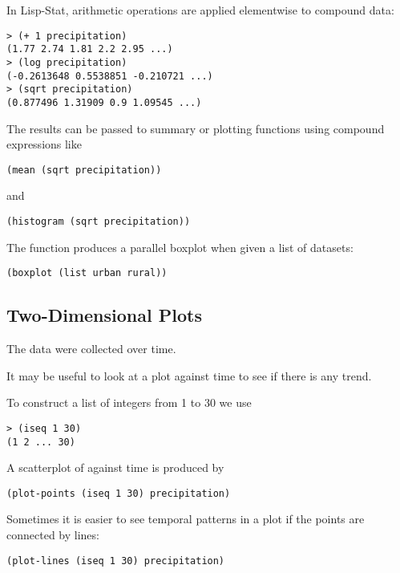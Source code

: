 \begin{slide}{}
In Lisp-Stat, arithmetic operations are applied elementwise to
compound data:
\begin{verbatim}
> (+ 1 precipitation)
(1.77 2.74 1.81 2.2 2.95 ...) 
> (log precipitation)
(-0.2613648 0.5538851 -0.210721 ...)
> (sqrt precipitation)
(0.877496 1.31909 0.9 1.09545 ...)
\end{verbatim}

The results can be passed to summary or plotting functions using
compound expressions like
\begin{verbatim}
(mean (sqrt precipitation))
\end{verbatim}
and
\begin{verbatim}
(histogram (sqrt precipitation))
\end{verbatim}

The  function produces a parallel boxplot when given a
list of datasets:
\begin{verbatim}
(boxplot (list urban rural))
\end{verbatim}
\end{slide}

\begin{slide}{}
\subsection{Two-Dimensional Plots}
The  data were collected over time.

It may be useful to look at a plot against time to see if there is any trend.

To construct a list of integers from 1 to 30 we use
\begin{verbatim}
> (iseq 1 30)
(1 2 ... 30)
\end{verbatim}
A scatterplot of  against time is produced
by
\begin{verbatim}
(plot-points (iseq 1 30) precipitation)
\end{verbatim}
Sometimes it is easier to see temporal patterns in a plot if the
points are connected by lines:
\begin{verbatim}
(plot-lines (iseq 1 30) precipitation)
\end{verbatim}
\end{slide}


